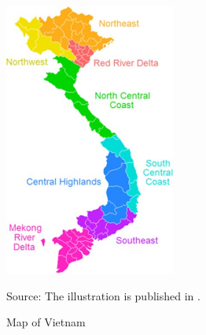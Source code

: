 \documentclass[10pt,a4paper]{article}
\begin{document}
\begin{figure}[h]
\caption{Map of Vietnam}\label{fig:MapVietnam}
\begin{center}
\includegraphics[width = 0.5\textwidth, height = 0.7\textwidth]{pictures/VietnamStatisticalRegions.jpg}
\end{center}
\footnotesize{Source: The illustration is published in \cite{boateng2012GIS}.}
\end{figure}
\end{document}
